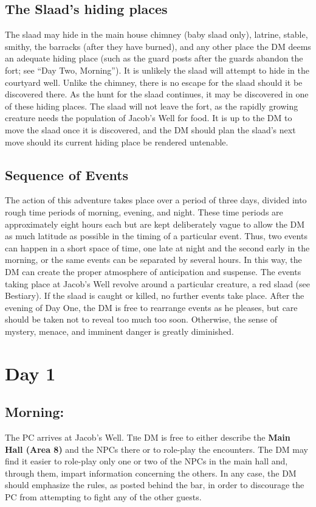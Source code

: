 \documentclass[a5paper,11pt,twoside]{book}
\newcommand{\MapText}[1]{
	{\color{DarkCyan} \textbf{#1}}
}
\begin{document}
\section*{The Slaad's hiding places} The slaad may hide in the main house chimney (baby slaad only), latrine, stable, smithy, the barracks (after they have burned), and any other place the DM deems an adequate hiding place (such as the guard posts after the guards abandon the fort; see “Day Two, Morning”).
It is unlikely the slaad will attempt to hide in the courtyard well.
Unlike the chimney, there is no escape for the slaad should it be discovered there.
As the hunt for the slaad continues, it may be discovered in one of these hiding places.
The slaad will not leave the fort, as the rapidly growing creature needs the population of Jacob’s Well for food.
It is up to the DM to move the slaad once it is discovered, and the DM should plan the slaad’s next move should its current hiding place be rendered untenable.

\section*{Sequence of Events }
The action of this adventure takes place over a period of three days, divided into rough time periods of morning, evening, and night.
These time periods are approximately eight hours each but are kept deliberately vague to allow the DM as much latitude as possible in the timing of a particular event.
Thus, two events can happen in a short space of time, one late at night and the second early in the morning, or the same events can be separated by several hours.
In this way, the DM can create the proper atmosphere of anticipation and suspense.
The events taking place at Jacob’s Well revolve around a particular creature, a red slaad (see Bestiary).
If the slaad is caught or killed, no further events take place.
After the evening of Day One, the DM is free to rearrange events as he pleases, but care should be taken not to reveal too much too soon.
Otherwise, the sense of mystery, menace, and imminent danger is greatly diminished.

\chapter{Day 1}
\section*{Morning: } The PC arrives at Jacob’s Well.
\lettrine[loversize=0.3,
lines=3,
slope=-0.1em,
nindent=5pt,
lhang=0.35]{T}he DM is free to either describe the \MapText{Main Hall (Area 8)} and the NPCs there or to role-play the encounters.
The DM may find it easier to role-play only one or two of the NPCs in the main hall and, through them, impart information concerning the others.
In any case, the DM should emphasize the rules, as posted behind the bar, in order to discourage the PC from attempting to fight any of the other guests.
\end{document}

